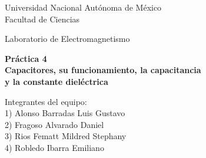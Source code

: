 \documentclass[letterpaper, 11 pt]{article}
\begin{document}
\begin{center}
\vspace*{0.2in}
{\fontsize{21}{21}\selectfont Universidad Nacional Autónoma de México}\\
\vspace*{0.2in}
{\fontsize{18}{18}\selectfont Facultad de Ciencias}\\
\vspace*{0.2in}
\begin{large}
{\fontsize{14}{14}\selectfont Laboratorio de Electromagnetismo} \\
\end{large}
\vspace*{0.2in}
\vspace*{0.2in}
\begin{Large}
\textbf{Práctica 4} \\
\textbf{ Capacitores, su funcionamiento, la capacitancia \\y la constante dieléctrica } \\
\end{Large}
\vspace{.7 cm}
Integrantes del equipo:\\
1) Alonso Barradas Luis Gustavo\\ 
2) Fragoso Alvarado Daniel\\ 
3) Rios Fematt Mildred Stephany\\ 
4) Robledo Ibarra Emiliano\\

\end{center}
\end{document}
